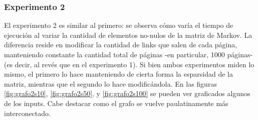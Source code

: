 \begin{figure}[ht]
\qquad
{}
\end{figure}


\FloatBarrier

\subsubsection{Experimento 2}
\par El experimento 2 es similar al primero: se observa c\'omo var\'ia el tiempo de ejecuci\'on al variar la cantidad de elementos no-nulos de la matriz de Markov.
La diferencia reside en modificar la cantidad de links que salen de cada p\'agina, manteniendo constante la cantidad total de p\'aginas -en particular, 1000 p\'aginas- 
(es decir, al rev\'es que en el experimento 1).
Si bien ambos experimentos miden lo mismo, el primero lo hace manteniendo de cierta forma la esparsidad de la matriz, mientras que el segundo lo hace modific\'andola.
En las figuras \ref{fig:grafo2s10}, \ref{fig:grafo2s50}, y \ref{fig:grafo2s100} se pueden ver graficados algunos de los inputs.
Cabe destacar como el grafo se vuelve paulatinamente m\'as interconectado.

\FloatBarrier

